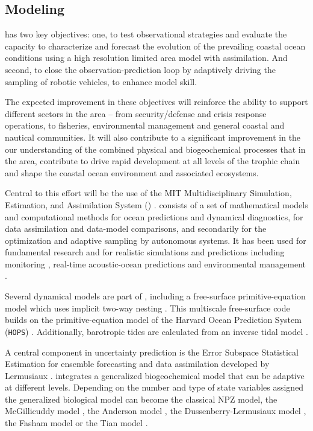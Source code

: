 \vspace{+0.25cm}
\subsection{Modeling}

\proj    has two key objectives: one, to test observational strategies
and evaluate the capacity to characterize and forecast the evolution
of the prevailing coastal ocean conditions using a high resolution
limited area model with assimilation. And second, to close the
observation-prediction loop by adaptively driving the sampling of
robotic vehicles, to enhance model skill.

The expected improvement in these objectives will reinforce the
ability to support different sectors in the area -- from
security/defense and crisis response operations, to fisheries,
environmental management and general coastal and nautical
communities. It will also contribute to a significant improvement in
the our understanding of the combined physical and biogeochemical
processes that in the \naz area, contribute to drive rapid
development at all levels of the trophic chain and shape the coastal
ocean environment and associated ecosystems.

Central to this effort will be the use of the MIT Multidisciplinary
Simulation, Estimation, and Assimilation System (\msee)
\cite{haley10,mseas10}. \mse consists of a set of mathematical models
and computational methods for ocean predictions and dynamical
diagnostics, for data assimilation and data-model comparisons, and
secondarily for the optimization and adaptive sampling by autonomous
systems. It has been used for fundamental research and for realistic
simulations and predictions including monitoring \cite{lermusiaux07},
real-time acoustic-ocean predictions \cite{xu08,lermusiaux10} and
environmental management \cite{cossarini09}.

Several dynamical models are part of \msee, including a free-surface
primitive-equation model which uses implicit two-way nesting
\cite{haley10}. This multiscale free-surface code builds on the
primitive-equation model of the Harvard Ocean Prediction System
(\texttt{HOPS}) \cite{robinson96,haley99}.  Additionally, barotropic
tides are calculated from an inverse tidal model
\cite{logutov08a,logutov08b}.

A central component in \mse uncertainty prediction is the Error
Subspace Statistical Estimation for ensemble forecasting and data
assimilation developed by Lermusiaux
\cite{lermusiaux06,lermusiaux07}. \mse integrates a generalized
biogeochemical model that can be adaptive at different
levels. Depending on the number and type of state variables assigned
the generalized biological model can become the classical NPZ model,
the McGillicuddy model \cite{mcgillicuddy95}, the Anderson model
\cite{anderson00}, the Dussenberry-Lermusiaux model
\cite{becsiktepe03}, the Fasham model \cite{fasham90} or the Tian
model \cite{tian00,tian01}.

